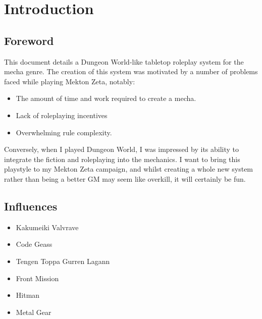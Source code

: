\section{Introduction}
\subsection{Foreword}
This document details a Dungeon World-like tabletop roleplay system for the mecha genre. The creation of this system was motivated by a number of problems faced while playing Mekton Zeta, notably:
\begin{itemize}
\item The amount of time and work required to create a mecha.
\item Lack of roleplaying incentives
\item Overwhelming rule complexity.
\end{itemize}

Conversely, when I played Dungeon World, I was impressed by its ability to integrate the fiction and roleplaying into the mechanics. I want to bring this playstyle to my Mekton Zeta campaign, and whilst creating a whole new system rather than being a better GM may seem like overkill, it will certainly be fun.

\subsection{Influences}
\begin{itemize}
\item Kakumeiki Valvrave
\item Code Geass
\item Tengen Toppa Gurren Lagann
\item Front Mission
\item Hitman
\item Metal Gear
\end{itemize}
